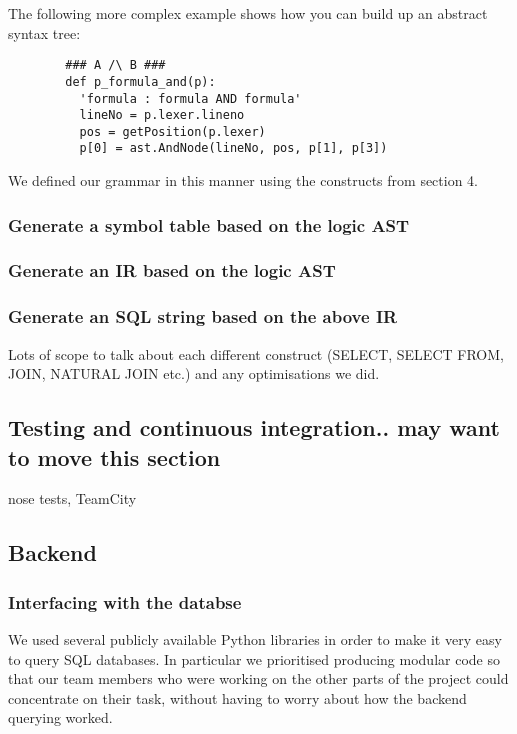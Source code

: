 \documentclass[a4paper, 11pt]{article}
\begin{document}
      The following more complex example shows how you can build up an abstract
      syntax tree:

      \begin{verbatim}
        ### A /\ B ###
        def p_formula_and(p):
          'formula : formula AND formula'
          lineNo = p.lexer.lineno
          pos = getPosition(p.lexer)
          p[0] = ast.AndNode(lineNo, pos, p[1], p[3])
       \end{verbatim}

       We defined our grammar in this manner using the constructs from section 4.


    \subsubsection{Generate a symbol table based on the logic AST}


    \subsubsection{Generate an IR based on the logic AST}

    \subsubsection{Generate an SQL string based on the above IR}
      Lots of scope to talk about each different construct (SELECT, SELECT FROM, JOIN, NATURAL JOIN etc.) and any optimisations we did.

  \subsection{Testing and continuous integration.. may want to move this section}
    nose tests, TeamCity
    \subsection{Backend}
     \subsubsection{Interfacing with the databse}

      We used several publicly available Python libraries in order to make 
      it very easy to query SQL databases. In particular we prioritised
      producing modular code so that our team members who were working on the
      other parts of the project could concentrate on their task, without having
      to worry about how the backend querying worked.
\end{document}
